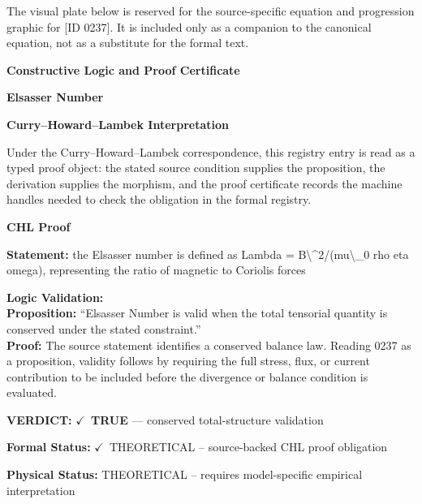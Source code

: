 \begingroup\footnotesize\sloppy
The visual plate below is reserved for the source-specific equation and progression graphic for [ID 0237]. It is included only as a companion to the canonical equation, not as a substitute for the formal text.
\par\endgroup
\ifTZPDarkEdition
{}
\fi

\clearpage
\begingroup\tzpsupportsetup
\noindent\textbf{\fontsize{10.8pt}{12.8pt}\selectfont [ID 0237] Constructive Logic and Proof Certificate}\par
\noindent\textbf{\fontsize{10pt}{12pt}\selectfont Elsasser Number}\par
\vspace{0.45em}
\begingroup
\footnotesize
\setlength{\parskip}{0.22em}
\setlength{\parindent}{0pt}
\noindent\textbf{Curry--Howard--Lambek Interpretation}\par
Under the Curry--Howard--Lambek correspondence, this registry entry is read as a typed proof
object: the stated source condition supplies the proposition, the derivation supplies the
morphism, and the proof certificate records the machine handles needed to check the obligation
in the formal registry.

\vspace{0.45em}
\noindent\textbf{CHL Proof}\par
\textbf{Statement:} the Elsasser number is defined as Lambda = B\textbackslash{}\textasciicircum{}2/(mu\textbackslash{}\_0 rho eta omega), representing the
ratio of magnetic to Coriolis forces

\textbf{Logic Validation:}\\
\textbf{Proposition:} ``Elsasser Number is valid when the total tensorial quantity is conserved under the stated
constraint.''\\
\textbf{Proof:} The source statement identifies a conserved balance law. Reading 0237 as a proposition,
validity follows by requiring the full stress, flux, or current contribution to be
included before the divergence or balance condition is evaluated.

\textbf{VERDICT:} \ensuremath{\checkmark}\ \textbf{TRUE} --- conserved total-structure validation

\textbf{Formal Status:} \ensuremath{\checkmark}\ THEORETICAL -- source-backed CHL proof obligation

\textbf{Physical Status:} THEORETICAL -- requires model-specific empirical interpretation
\par\vspace{0.45em}
\par
\ifTZPDarkEdition
{}
\fi
\endgroup
\endgroup
